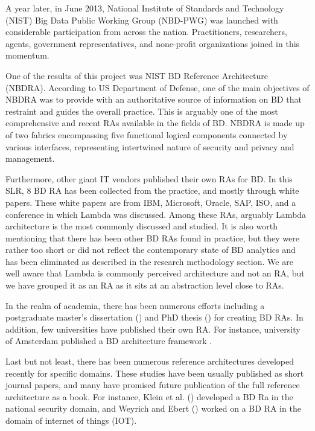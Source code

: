 \documentclass{ieeeaccess}
\begin{document}
A year later, in June 2013, National Institute of Standards and Technology (NIST) Big Data Public Working Group (NBD-PWG) was launched with considerable participation from across the nation. Practitioners, researchers, agents, government representatives, and none-profit organizations joined in this momentum.

One of the results of this project was NIST BD Reference Architecture (NBDRA). According to US Department of Defense, one of the main objectives of NBDRA was to provide with an authoritative source of information on BD that restraint and guides the overall practice. This is arguably one of the most comprehensive and recent RAs available in the fields of BD. NBDRA is made up of two fabrics encompassing five functional logical components connected by various interfaces, representing intertwined nature of security and privacy and management.

Furthermore, other giant IT vendors published their own RAs for BD. In this SLR, 8 BD RA has been collected from the practice, and mostly through white papers. These white papers are from IBM, Microsoft, Oracle, SAP, ISO, and a conference in which Lambda was discussed. Among these RAs, arguably Lambda architecture is the most commonly discussed and studied. It is also worth mentioning that there has been other BD RAs found in practice, but they were rather too short or did not reflect the contemporary state of BD analytics and has been eliminated as described in the research methodology section. We are well aware that Lambda is commonly perceived architecture and not an RA, but we have grouped it as an RA as it sits at an abstraction level close to RAs.

In the realm of academia, there has been numerous efforts including a postgraduate master’s dissertation (\cite{Maier}) and PhD thesis (\cite{suthakar2017scalable}) for creating BD RAs. In addition, few universities have published their own RA. For instance, university of Amsterdam published a BD architecture framework \cite{framework2015draft}. 

Last but not least, there has been numerous reference architectures developed recently for specific domains. These studies have been usually published as short journal papers, and many have promised future publication of the full reference architecture as a book. For instance, Klein et al. (\cite{Klein}) developed a BD Ra in the national security domain, and Weyrich and Ebert (\cite{weyrich2015reference}) worked on a BD RA in the domain of internet of things (IOT). 
\end{document}
